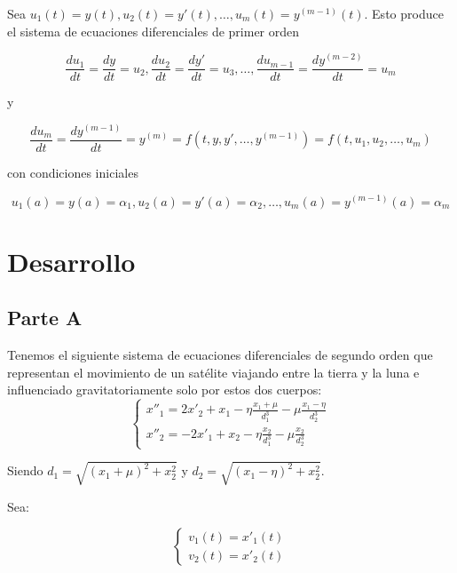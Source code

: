 \documentclass[titlepage,a4paper]{article}
\begin{document}
			Sea $u_{1}(t)=y(t),u_{2}(t)=y'(t),\dots,u_{m}(t)=y^{(m-1)}(t)$. Esto produce el sistema de ecuaciones diferenciales 
			de primer orden

			\begin{equation}
				\frac{du_{1}}{dt}=\frac{dy}{dt}=u_{2},\frac{du_{2}}{dt}=\frac{dy'}{dt}=u_{3},\dots,\frac{du_{m-1}}{dt}=\frac{dy^{(m-2)}}{dt}=u_{m}
			\end{equation}

			y

			\begin{equation}
				\frac{du_{m}}{dt}=\frac{dy^{(m-1)}}{dt}=y^{(m)}=f(t,y,y',\dots,y^{(m-1)})=f(t,u_{1},u_{2},\dots,u_{m})
			\end{equation}

			con condiciones iniciales

			\begin{equation}
				u_{1}(a)=y(a)=\alpha_{1}, u_{2}(a)=y'(a)=\alpha_{2},\dots,u_{m}(a)=y^{(m-1)}(a)=\alpha_{m}
			\end{equation}
\section{Desarrollo}\label{sec:desarrollo}
	\subsection{Parte A}\label{sec:parteA}

		Tenemos el siguiente sistema de ecuaciones diferenciales de segundo orden que representan el movimiento de un satélite
		viajando entre la tierra y la luna e influenciado gravitatoriamente solo por estos dos cuerpos:
		\begin{equation}
			\begin{cases}
				x''_{1} = 2x'_{2} + x_{1} - \eta\frac{x_{1} + \mu}{d_{1}^{3}} - \mu\frac{x_{1}-\eta}{d_{2}^{3}}\\
				x''_{2} = -2x'_{1} + x_{2} - \eta\frac{x_{2}}{d_{1}^{3}} - \mu\frac{x_{2}}{d_{2}^{3}}
			\end{cases}
		\end{equation}

		Siendo $d_{1}=\sqrt{(x_{1}+\mu)^{2} + x_{2}^{2}}$ y $d_{2}=\sqrt{(x_{1}-\eta)^{2} + x_{2}^{2}}$.

		Sea:

		\begin{equation}
			\begin{cases}
				v_{1}(t) = x'_{1}(t)\\
				v_{2}(t) = x'_{2}(t)
			\end{cases}
		\end{equation}
\end{document}
